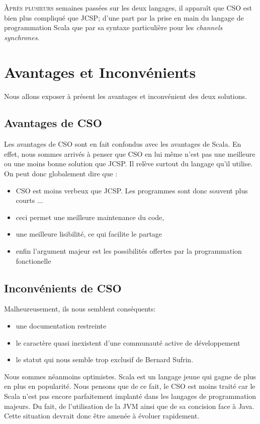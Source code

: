 \documentclass[a4paper,11pt,french]{report}
\begin{document}
\lettrine{\`A}{près plusieurs} semaines passées sur les deux langages, il appara\^it que CSO est bien plus compliqué que JCSP; d'une part par la prise en main du langage de programmation Scala que par sa syntaxe particulière pour les \emph{channels synchrones}.\\

\section{Avantages et Inconvénients}
Nous allons exposer à présent les avantages et inconvénient des deux solutions.

\subsection{Avantages de CSO}
Les avantages de CSO sont en fait confondus avec les avantages de Scala. En effet, nous sommes arrivés à penser que CSO en lui m\^eme n'est pas une meilleure ou une moins bonne solution que JCSP. Il relève surtout du langage qu'il utilise. On peut donc globalement dire que :
\begin{itemize}
\item CSO est moins verbeux que JCSP. Les programmes sont donc souvent plus courts ...
\item ceci permet une meilleure maintenance du code,
\item une meilleure lisibilité, ce qui facilite le partage
\item enfin l'argument majeur est les possibilités offertes par la programmation fonctionelle
\end{itemize}

\subsection{Inconvénients de CSO}
Malheureusement, ils nous semblent conséquents:
 \begin{itemize}
\item une documentation restreinte
\item le caractère quasi inexistent d'une communauté active de développement
\item le statut qui nous semble trop exclusif de Bernard Sufrin.
\end{itemize}

Nous sommes néanmoins optimistes.  Scala est un langage jeune qui gagne de plus en plus en popularité. Nous pensons que de ce fait, le CSO est moins traité car le Scala n'est pas encore parfaitement implanté dans les langages de programmation majeurs. Du fait, de l'utilisation de la JVM ainsi que de sa concision face à Java. Cette situation devrait donc être amenée à évoluer rapidement.
\end{document}
